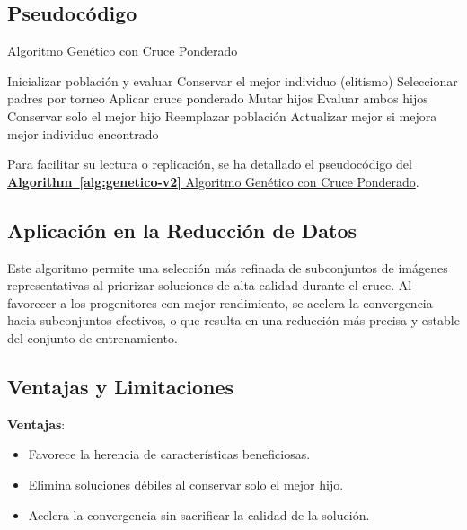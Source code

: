 \subsection{Pseudocódigo}\label{subsec:Pseudocodigo-genetico-v2}
\begin{algorithm}[htp]
      \caption{Algoritmo Genético con Cruce Ponderado}
      \label{alg:genetico-v2}
      \begin{algorithmic}[1]
            \State Inicializar población y evaluar
            \State Conservar el mejor individuo (elitismo)
            \State Seleccionar padres por torneo
            \State Aplicar cruce ponderado
            \State Mutar hijos
            \State Evaluar ambos hijos
            \State Conservar solo el mejor hijo
            \EndWhile
            \State Reemplazar población
            \State Actualizar mejor si mejora
            \EndWhile
            \State \Return mejor individuo encontrado
      \end{algorithmic}
\end{algorithm}

Para facilitar su lectura o replicación, se ha detallado el pseudocódigo del \hyperref[alg:genetico-v2]{\textbf{Algorithm~\ref*{alg:genetico-v2}} Algoritmo Genético con Cruce Ponderado}.

\subsection{Aplicación en la Reducción de Datos}\label{subsec:aplicacion-en-la-reduccion-de-datos-genetico-v2}
Este algoritmo permite una selección más refinada de subconjuntos de imágenes representativas al priorizar soluciones de alta calidad durante el cruce.
Al favorecer a los progenitores con mejor rendimiento, se acelera la convergencia hacia subconjuntos efectivos,
o que resulta en una reducción más precisa y estable del conjunto de entrenamiento.


\subsection{Ventajas y Limitaciones}\label{subsec:ventajas-y-limitaciones-genetico-v2}
\textbf{Ventajas}:
\begin{itemize}
      \item Favorece la herencia de características beneficiosas.
      \item Elimina soluciones débiles al conservar solo el mejor hijo.
      \item Acelera la convergencia sin sacrificar la calidad de la solución.
\end{itemize}


